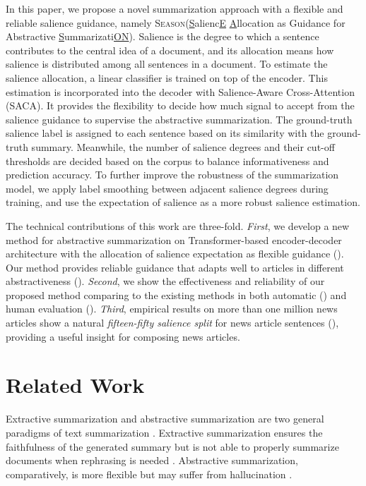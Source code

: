 \documentclass[11pt]{article}
\newcommand{\stitle}[1]{\vspace{1ex} \noindent{\bf #1.}}
\newcommand{\MODEL}{\mbox{\textsc{Season}}\xspace}
\begin{document}
In this paper, we propose a novel summarization approach with a flexible and reliable salience guidance,
namely \MODEL ({\underline{S}}alienc{\underline{E}} {\underline{A}}llocation as Guidance for Abstractive {\underline{S}}ummarizati{\underline{ON}}). 
Salience is the degree to which a sentence contributes to the central idea of a document, and its allocation means how salience is distributed among all sentences in a document.
To estimate the salience allocation,
a linear classifier is trained on top of the encoder.
This estimation is incorporated into the decoder with Salience-Aware Cross-Attention (SACA).
It provides the flexibility to decide how much signal to accept from the salience guidance to supervise the abstractive summarization.
The ground-truth salience label is assigned to each sentence based on its similarity with the ground-truth summary.
Meanwhile, the number of salience degrees and their cut-off thresholds are decided based on the corpus to balance informativeness and prediction accuracy.
To further improve the robustness of the summarization model, 
we apply label smoothing between adjacent salience degrees during training,
and use the expectation of salience as a more robust salience estimation.


The technical contributions of this work are three-fold.
    \emph{First}, we develop a new method for abstractive summarization on Transformer-based encoder-decoder architecture with the allocation of salience expectation as flexible guidance ().
    Our method 
    provides reliable guidance that adapts well to articles in different abstractiveness ().
    \emph{Second}, we show the effectiveness and reliability of our proposed method comparing to the existing methods in both automatic () and human evaluation  ().
    \emph{Third}, empirical results on more than one million news articles show a natural \emph{fifteen-fifty salience split} for news article sentences (),
    providing a useful insight for composing news articles.




 \section{Related Work}


\stitle{Joint extractive and abstractive summarization}
Extractive summarization and abstractive summarization are two general paradigms of text summarization \cite{see2017get,grusky2018newsroom}. Extractive summarization ensures the faithfulness of the generated summary but is not able to properly summarize documents when rephrasing is needed \cite{liu2009extractive}. Abstractive summarization, comparatively, is more flexible but may suffer from hallucination \cite{maynez2020faithfulness}.
\end{document}
